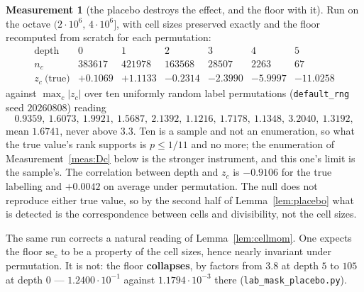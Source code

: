 \documentclass[11pt,a4paper]{article}
\theoremstyle{plain}
\theoremstyle{definition}
\newtheorem{measurement}[theorem]{Measurement}
\theoremstyle{remark}
\begin{document}
\begin{measurement}[the placebo destroys the effect, and the floor
with it]\label{meas:placebo}
Run on the octave $(2\cdot10^6,\,4\cdot10^6]$, with cell sizes
preserved exactly and the floor recomputed from scratch for each
permutation:
\[
\begin{array}{r|cccccc}
 \text{depth} & 0 & 1 & 2 & 3 & 4 & 5\\
 n_c & 383617 & 421978 & 163568 & 28507 & 2263 & 67\\\hline
 z_c\ \text{(true)} & +0.1069 & +1.1133 & -0.2314 & -2.3990
   & -5.9997 & -11.0258
\end{array}
\]
against $\max_c|z_c|$ over ten uniformly random label permutations
(\texttt{default\_rng} seed $20260808$) reading
\[
  0.9359,\ 1.6073,\ 1.9921,\ 1.5687,\ 2.1392,\
  1.1216,\ 1.7178,\ 1.1348,\ 3.2040,\ 1.3192,
\]
mean $1.6741$, never above $3.3$. Ten is a sample and not an
enumeration, so what the true value's rank supports is $p\le1/11$ and
no more; the enumeration of Measurement~\ref{meas:Dc} below is the
stronger instrument, and this one's limit is the sample's. The
correlation between depth and $z_c$ is $-0.9106$ for the true
labelling and $+0.0042$ on average under permutation. The null does
not reproduce either true value, so by the second half of
Lemma~\ref{lem:placebo} what is detected is the correspondence between
cells and divisibility, not the cell sizes.

The same run corrects a natural reading of Lemma~\ref{lem:cellmom}.
One expects the floor $\mathrm{se}_c$ to be a property of the cell
sizes, hence nearly invariant under permutation. It is not: the floor
\textbf{collapses}, by factors from $3.8$ at depth $5$ to $105$ at
depth $0$ --- $1.2400\cdot10^{-1}$ against $1.1794\cdot10^{-3}$ there
(\texttt{lab\_mask\_placebo.py}).
\end{measurement}
\end{document}
